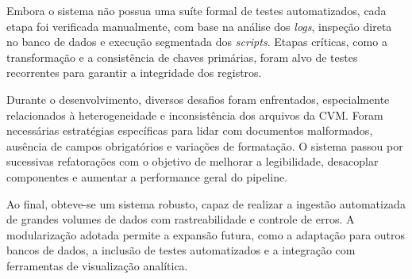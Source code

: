 Embora o sistema não possua uma suíte formal de testes automatizados, cada etapa foi verificada manualmente, com base na análise dos \textit{logs}, inspeção direta no banco de dados e execução segmentada dos \textit{scripts}. Etapas críticas, como a transformação e a consistência de chaves primárias, foram alvo de testes recorrentes para garantir a integridade dos registros.

Durante o desenvolvimento, diversos desafios foram enfrentados, especialmente relacionados à heterogeneidade e inconsistência dos arquivos da CVM. Foram necessárias estratégias específicas para lidar com documentos malformados, ausência de campos obrigatórios e variações de formatação. O sistema passou por sucessivas refatorações com o objetivo de melhorar a legibilidade, desacoplar componentes e aumentar a performance geral do pipeline.

Ao final, obteve-se um sistema robusto, capaz de realizar a ingestão automatizada de grandes volumes de dados com rastreabilidade e controle de erros. A modularização adotada permite a expansão futura, como a adaptação para outros bancos de dados, a inclusão de testes automatizados e a integração com ferramentas de visualização analítica.


